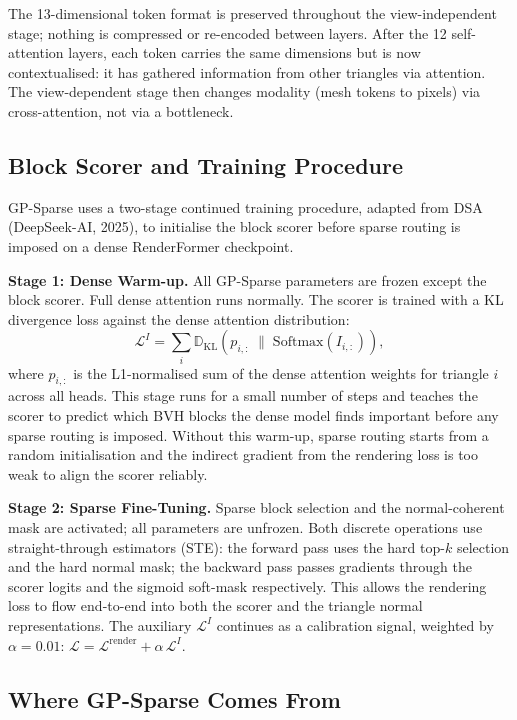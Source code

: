 \documentclass[11pt,letterpaper]{article}
\begin{document}
The 13-dimensional token format is preserved throughout the view-independent
stage; nothing is compressed or re-encoded between layers.
After the 12 self-attention layers, each token carries the same dimensions
but is now contextualised: it has gathered information from other triangles
via attention.
The view-dependent stage then changes modality (mesh tokens to pixels) via
cross-attention, not via a bottleneck.

\subsection*{Block Scorer and Training Procedure}

GP-Sparse uses a two-stage continued training procedure, adapted from DSA
(DeepSeek-AI, 2025), to initialise the block scorer before sparse routing
is imposed on a dense RenderFormer checkpoint.

\textbf{Stage 1: Dense Warm-up.}
All GP-Sparse parameters are frozen except the block scorer.
Full dense attention runs normally.
The scorer is trained with a KL divergence loss against the dense attention
distribution:
\begin{equation}
  \mathcal{L}^I = \sum_i \mathbb{D}_{\mathrm{KL}}\!\left(
    p_{i,:} \;\Big\|\; \mathrm{Softmax}(I_{i,:}) \right),
  \label{eq:scorer_warm_up}
\end{equation}
where $p_{i,:}$ is the L1-normalised sum of the dense attention weights for
triangle $i$ across all heads.
This stage runs for a small number of steps and teaches the scorer to predict
which BVH blocks the dense model finds important before any sparse routing is
imposed.
Without this warm-up, sparse routing starts from a random initialisation and
the indirect gradient from the rendering loss is too weak to align the scorer
reliably.

\textbf{Stage 2: Sparse Fine-Tuning.}
Sparse block selection and the normal-coherent mask are activated; all
parameters are unfrozen.
Both discrete operations use straight-through estimators (STE): the
forward pass uses the hard top-$k$ selection and the hard normal mask;
the backward pass passes gradients through the scorer logits and the
sigmoid soft-mask respectively.
This allows the rendering loss to flow end-to-end into both the scorer
and the triangle normal representations.
The auxiliary $\mathcal{L}^I$ continues as a calibration signal, weighted
by $\alpha = 0.01$:
$\mathcal{L} = \mathcal{L}^{\text{render}} + \alpha\,\mathcal{L}^I$.

\subsection*{Where GP-Sparse Comes From}
\end{document}
